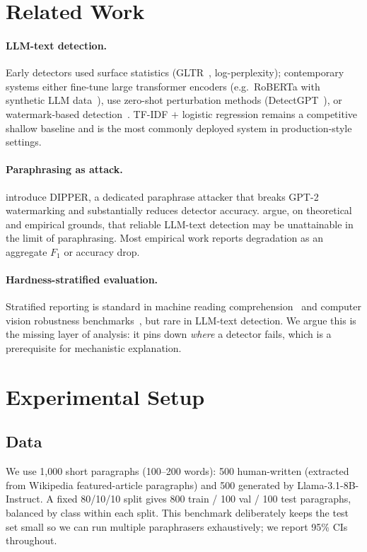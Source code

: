 \documentclass[11pt,a4paper]{article}
\begin{document}
\section{Related Work}

\paragraph{LLM-text detection.}
Early detectors used surface statistics
(GLTR~\citep{gehrmann2019gltr}, log-perplexity); contemporary
systems either fine-tune large transformer encoders
(e.g.\ RoBERTa with synthetic LLM data~\citep{guo2023gpt}),
use zero-shot perturbation methods
(DetectGPT~\citep{mitchell2023detectgpt}),
or watermark-based detection~\citep{kirchenbauer2023watermark}.
TF-IDF $+$ logistic regression remains a competitive shallow baseline and is
the most commonly deployed system in production-style settings.

\paragraph{Paraphrasing as attack.}
\citet{krishna2023paraphrasing} introduce DIPPER, a dedicated paraphrase
attacker that breaks GPT-2 watermarking and substantially reduces detector
accuracy. \citet{sadasivan2023can} argue, on theoretical and empirical
grounds, that reliable LLM-text detection may be unattainable in the limit
of paraphrasing. Most empirical work reports degradation as an aggregate
$F_1$ or accuracy drop.

\paragraph{Hardness-stratified evaluation.}
Stratified reporting is standard in machine reading
comprehension~\citep{rajpurkar2018know} and computer vision robustness
benchmarks~\citep{taori2020measuring}, but rare in LLM-text
detection. We argue this is the missing layer of analysis: it pins down
\emph{where} a detector fails, which is a prerequisite for mechanistic explanation.

\section{Experimental Setup}
\label{sec:setup}

\subsection{Data}
We use 1{,}000 short paragraphs (100--200 words):
500 human-written (extracted from Wikipedia featured-article paragraphs)
and 500 generated by Llama-3.1-8B-Instruct.
A fixed 80/10/10 split gives 800 train / 100 val / 100 test paragraphs,
balanced by class within each split.
This benchmark deliberately keeps the test set small so we can run multiple
paraphrasers exhaustively; we report 95\% CIs throughout.
\end{document}
